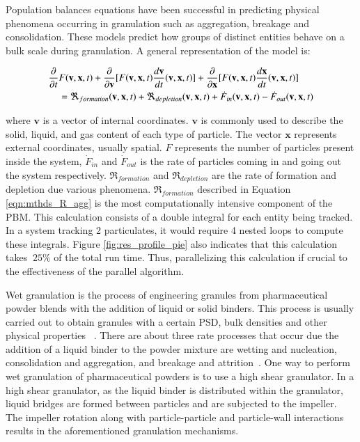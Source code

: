 \documentclass[preprint,10pt,authoryear,review]{elsarticle}
\begin{document}
Population balances equations have been successful in 
predicting physical phenomena occurring in granulation such as aggregation, breakage and 
consolidation. These models predict how groups of distinct entities  behave on a bulk 
scale during granulation. A general representation of the model is:

\begin{align}
\frac{ \partial}{\partial t}&F(\textbf{v},\textbf{x},t) + \frac{\partial}{\partial 
\textbf{v}}[F(\textbf{v},\textbf{x},t)\frac{d\textbf{v}}{dt}(\textbf{v},\textbf{x},t)] 
+ \frac{\partial}{\partial \textbf{x}}[F(\textbf{v},\textbf{x},t)\frac{d\textbf{x}}{dt}
(\textbf{v},\textbf{x},t)] \notag\\
    &= 
\Re_{formation}(\textbf{v},\textbf{x},t)+\Re_{depletion}(\textbf{v},\textbf{x},t)
+\dot{F}_{in}(\textbf{v},\textbf{x},t) -\dot{F}_{out}(\textbf{v},\textbf{x},t) 
\label{eqn:bkgd_pbm_general} 
\end{align}

where $\textbf{v}$ is a vector of internal 
coordinates.  $\textbf{v}$ is commonly used to describe the solid, liquid, 
and gas content of each type of particle. The vector $\textbf{x}$ represents 
external coordinates, usually spatial. $F$ represents the 
number of particles present inside the system, $\dot{F}_{in}$ 
and $\dot{F}_{out}$ is the rate of particles coming in and going out the 
system respectively. $\Re_{formation}$ and $\Re_{depletion}$ are the rate of 
formation and depletion due various phenomena. $\Re_{formation}$ described in Equation 
\ref{eqn:mthds_R_agg} is the most computationally intensive component of the PBM.
This calculation consists of a double integral for each entity being tracked. In a 
system tracking 2 particulates, it would require 4 nested loops to compute these 
integrals. Figure \ref{fig:res_profile_pie} also indicates that this calculation 
takes $~25\%$ of the total run time. Thus, parallelizing this calculation if crucial 
to the effectiveness of the parallel algorithm.

Wet granulation is the process of engineering granules from pharmaceutical powder blends 
with the addition of liquid or solid binders. This process is usually carried out 
to obtain granules with a certain PSD,  bulk densities and other physical properties
~\citep{Barrasso2015cerd}. There are about three rate processes that occur due the addition 
of a liquid binder to the powder mixture are wetting and nucleation, consolidation and 
aggregation, and breakage and attrition~\citep{sen2014}. One way to perform wet
granulation of pharmaceutical powders is to use a high shear granulator. 
In a high shear granulator, as the liquid binder is distributed within the granulator, 
liquid bridges are formed between particles and are subjected to the impeller. 
The impeller rotation along with particle-particle and particle-wall interactions 
results in the aforementioned granulation mechanisms.
\end{document}

